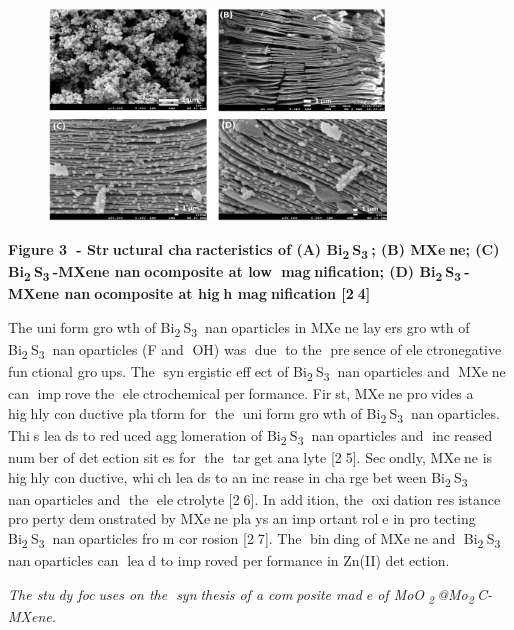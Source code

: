 {\begin{figure}[H]
	\centering
	\includegraphics[width=0.8\textwidth]{media/chem2/image14}
	\caption*{}
\end{figure}


{\bfseries Figure 3 - Structural characteristics of (A)
Bi\textsubscript{2}S\textsubscript{3}; (B) MXene; (C)
Bi\textsubscript{2}S\textsubscript{3}-MXene nanocomposite at low
magnification; (D) Bi\textsubscript{2}S\textsubscript{3}-MXene
nanocomposite at high magnification {[}24{]}}

The uniform growth of Bi\textsubscript{2}S\textsubscript{3}
nanoparticles in MXene layers growth of
Bi\textsubscript{2}S\textsubscript{3} nanoparticles (F and OH) was
due to the presence of electronegative functional groups. The
synergistic effect of Bi\textsubscript{2}S\textsubscript{3}
nanoparticles and MXene can improve the electrochemical
performance. First, MXene provides a highly conductive platform
for the uniform growth of Bi\textsubscript{2}S\textsubscript{3}
nanoparticles. This leads to reduced agglomeration of
Bi\textsubscript{2}S\textsubscript{3} nanoparticles and increased
number of detection sites for the target analyte {[}25{]}.
Secondly, MXene is highly conductive, which leads to an increase
in charge between Bi\textsubscript{2}S\textsubscript{3}
nanoparticles and the electrolyte {[}26{]}. In addition, the
oxidation resistance property demonstrated by MXene plays an
important role in protecting Bi\textsubscript{2}S\textsubscript{3}
nanoparticles from corrosion {[}27{]}. The binding of MXene and
Bi\textsubscript{2}S\textsubscript{3} nanoparticles can lead to
improved performance in Zn(II) detection.

\emph{The study focuses on the synthesis of a composite made of
MoO\textsubscript{2}@Mo\textsubscript{2}C-MXene.}

}
